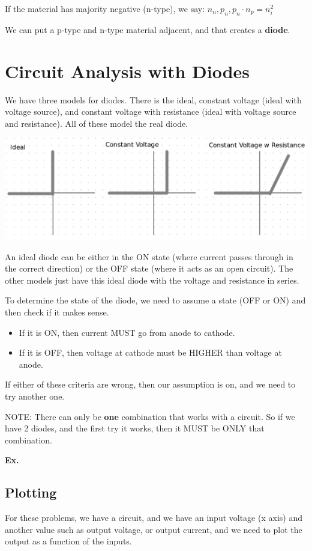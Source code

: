 \documentclass[12pt,letterpaper]{article} \usepackage{amsmath} \usepackage{graphicx} \usepackage[margin=1in]{geometry} \usepackage{longtable}  \usepackage{amssymb}
\begin{document}
	If the material has majority negative (n-type), we say: $n_n, p_n, p_n\cdot n_p = n_i^2$
	
	We can put a p-type and n-type material adjacent, and that creates a \textbf{diode}.
	
	\section{Circuit Analysis with Diodes}
	We have three models for diodes. There is the ideal, constant voltage (ideal with voltage source), and constant voltage with resistance (ideal with voltage source and resistance). All of these model the real diode. 
	\begin{center}
		\includegraphics[width=0.8\linewidth]{diode-models}
	\end{center}

	An ideal diode can be either in the ON state (where current passes through in the correct direction) or the OFF state (where it acts as an open circuit). The other models just have this ideal diode with the voltage and resistance in series. 
	
	To determine the state of the diode, we need to assume a state (OFF or ON) and then check if it makes sense.
	\begin{itemize}[]
		\item If it is ON, then current MUST go from anode to cathode.
		\item If it is OFF, then voltage at cathode must be HIGHER than voltage at anode. 
	\end{itemize}

	If either of these criteria are wrong, then our assumption is on, and we need to try another one. 
	
	NOTE: There can only be \textbf{one } combination that works with a circuit. So if we have 2 diodes, and the first try it works, then it MUST be ONLY that combination.
	
	\begin{mdframed}[]
		\textbf{Ex. }
	\end{mdframed}
	
	\subsection{Plotting}
	For these problems, we have a circuit, and we have an input voltage (x axis) and another value such as output voltage, or output current, and we need to plot the output as a function of the inputs. 
	
\end{document}
